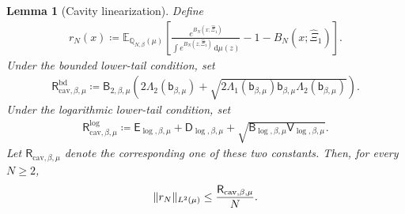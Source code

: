 \documentclass[11pt,reqno]{amsart}
\numberwithin{equation}{section}
\theoremstyle{plain}
\newtheorem{lemma}[lemma]{Lemma}
\theoremstyle{remark}
\DeclarePairedDelimiter{\norm}{\lVert}{\rVert}
\newcommand{\md}{\mathrm{d}}
\newcommand{\E}{{\mathbb{E}}}
\newcommand{\Q}{{\mathbb{Q}}}
\newcommand{\be}{\beta}
\begin{document}
\begin{lemma}[Cavity linearization]\label{lem:cavity-linearization}
Define
\begin{align}\label{eq:cavity-error-def}
 r_N(x)\coloneqq
 \E_{\Q_{N,\be}(\mu)}\left[
 \frac{e^{B_N(x;\hat\Xi_1)}}{\int e^{B_N(z;\hat\Xi_1)}\,\md\mu(z)}
 -1-B_N(x;\hat\Xi_1)\right].
\end{align}
Under the bounded lower-tail condition, set
\begin{align}\label{eq:R-cav-bounded-def}
 \mathsf R_{\mathrm{cav},\be,\mu}^{\mathrm{bd}}
 \coloneqq
 \mathsf B_{2,\be,\mu}
 \left(2\Lambda_2(\mathsf b_{\be,\mu})
 +\sqrt{2\Lambda_1(\mathsf b_{\be,\mu})\mathsf b_{\be,\mu}
          \Lambda_2(\mathsf b_{\be,\mu})}\right).
\end{align}
Under the logarithmic lower-tail condition, set
\begin{align}\label{eq:R-cav-log-def}
 \mathsf R_{\mathrm{cav},\be,\mu}^{\log}
 \coloneqq
 \mathsf E_{\log,\be,\mu}+\mathsf D_{\log,\be,\mu}
 +\sqrt{\mathsf B_{\log,\be,\mu}\mathsf V_{\log,\be,\mu}}.
\end{align}
Let \(\mathsf R_{\mathrm{cav},\be,\mu}\) denote the corresponding one of these two constants.  Then, for every \(N\ge2\),
\begin{align}\label{eq:cavity-error-bound}
 \norm{r_N}_{L^2(\mu)}\le \frac{\mathsf R_{\mathrm{cav},\be,\mu}}{N}.
\end{align}
\end{lemma}
\end{document}
